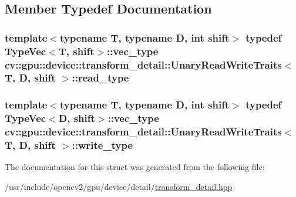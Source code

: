\subsection{Member Typedef Documentation}
\hypertarget{structcv_1_1gpu_1_1device_1_1transform__detail_1_1UnaryReadWriteTraits_a2319c756d4282dfdbbe2ee92d0457ad1}{
\subsubsection[{read\-\_\-type}]{\setlength{\rightskip}{0pt plus 5cm}template$<$typename T, typename D, int shift$>$ typedef {\bf Type\-Vec}$<${\bf T}, shift$>$\-::vec\-\_\-type {\bf cv\-::gpu\-::device\-::transform\-\_\-detail\-::\-Unary\-Read\-Write\-Traits}$<$ {\bf T}, D, shift $>$\-::{\bf read\-\_\-type}}}\label{structcv_1_1gpu_1_1device_1_1transform__detail_1_1UnaryReadWriteTraits_a2319c756d4282dfdbbe2ee92d0457ad1}
\hypertarget{structcv_1_1gpu_1_1device_1_1transform__detail_1_1UnaryReadWriteTraits_a5b420557d7aec765bee780f4510afc2b}{
\subsubsection[{write\-\_\-type}]{\setlength{\rightskip}{0pt plus 5cm}template$<$typename T, typename D, int shift$>$ typedef {\bf Type\-Vec}$<$D, shift$>$\-::vec\-\_\-type {\bf cv\-::gpu\-::device\-::transform\-\_\-detail\-::\-Unary\-Read\-Write\-Traits}$<$ {\bf T}, D, shift $>$\-::{\bf write\-\_\-type}}}\label{structcv_1_1gpu_1_1device_1_1transform__detail_1_1UnaryReadWriteTraits_a5b420557d7aec765bee780f4510afc2b}


The documentation for this struct was generated from the following file\-:\begin{DoxyCompactItemize}
\item 
/usr/include/opencv2/gpu/device/detail/\hyperlink{transform__detail_8hpp}{transform\-\_\-detail.\-hpp}\end{DoxyCompactItemize}
